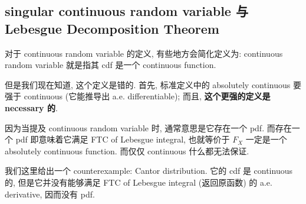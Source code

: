\subsection{singular continuous random variable 与 Lebesgue Decomposition Theorem}\label{singular-continuous-random-variable-ux4e0e-lebesgue-decomposition-theorem}

对于 continuous random variable 的定义, 有些地方会简化定义为: continuous random variable 就是指其 cdf 是一个 continuous function.

但是我们现在知道, 这个定义是错的. 首先, 标准定义中的 absolutely continuous 要强于 continuous (它能推导出 a.e. differentiable); 而且, \textbf{这个更强的定义是 necessary 的}.

因为当提及 continuous random variable 时, 通常意思是它存在一个 pdf. 而存在一个 pdf 即意味着它满足 FTC of Lebesgue integral, 也就等价于 \(\mathit{F}_{\mathit{X}}\) 一定是一个 absolutely continuous function. 而仅仅 continuous 什么都无法保证.

我们这里给出一个 counterexample: Cantor distribution. 它的 cdf 是 continuous 的, 但是它并没有能够满足 FTC of Lebesgue integral (返回原函数) 的 a.e. derivative, 因而没有 pdf.

